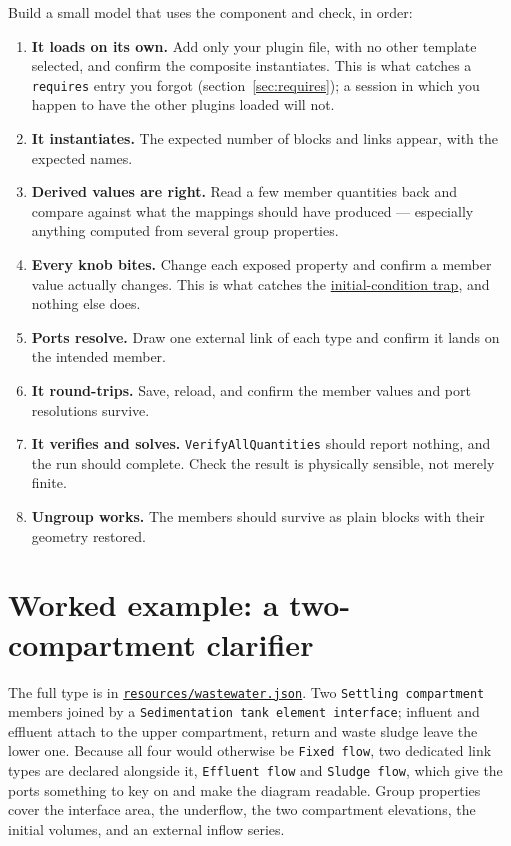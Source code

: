 \documentclass[11pt,a4paper]{article}
\newcommand{\code}[1]{\texttt{\small #1}}
\newcommand{\file}[1]{\texttt{\small #1}}
\newcommand{\ghbase}{https://github.com/ArashMassoudieh/OpenHydroQual/blob/master}
\newcommand{\exfile}[1]{\href{\ghbase/#1}{\file{#1}}}
\begin{document}
Build a small model that uses the component and check, in order:

\begin{enumerate}[leftmargin=1.6em]
\item \textbf{It loads on its own.} Add only your plugin file, with no other
template selected, and confirm the composite instantiates. This is what catches
a \code{requires} entry you forgot (section~\ref{sec:requires}); a session in
which you happen to have the other plugins loaded will not.
\item \textbf{It instantiates.} The expected number of blocks and links appear,
with the expected names.
\item \textbf{Derived values are right.} Read a few member quantities back and
compare against what the mappings should have produced --- especially anything
computed from several group properties.
\item \textbf{Every knob bites.} Change each exposed property and confirm a
member value actually changes. This is what catches the
\hyperref[sec:initial]{initial-condition trap}, and nothing else does.
\item \textbf{Ports resolve.} Draw one external link of each type and confirm it
lands on the intended member.
\item \textbf{It round-trips.} Save, reload, and confirm the member values and
port resolutions survive.
\item \textbf{It verifies and solves.} \code{VerifyAllQuantities} should report
nothing, and the run should complete. Check the result is physically sensible,
not merely finite.
\item \textbf{Ungroup works.} The members should survive as plain blocks with
their geometry restored.
\end{enumerate}

\section{Worked example: a two-compartment clarifier}

The full type is in \exfile{resources/wastewater.json}. Two
\code{Settling compartment} members joined by a
\code{Sedimentation tank element interface}; influent and effluent attach to
the upper compartment, return and waste sludge leave the lower one. Because all
four would otherwise be \code{Fixed flow}, two dedicated link types are
declared alongside it, \code{Effluent flow} and \code{Sludge flow}, which give
the ports something to key on and make the diagram readable. Group properties
cover the interface area, the underflow, the two compartment elevations, the
initial volumes, and an external inflow series.
\end{document}
